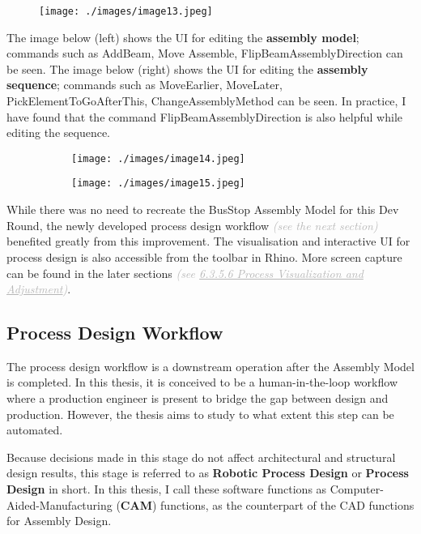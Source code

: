 \begin{figure}[H]
\texttt{[image: ./images/image13.jpeg]}
\end{figure}


The image below (left) shows the UI for editing the \textbf{assembly model}; commands such as AddBeam, Move Assemble, FlipBeamAssemblyDirection can be seen. The image below (right) shows the UI for editing the \textbf{assembly sequence}; commands such as MoveEarlier, MoveLater, PickElementToGoAfterThis, ChangeAssemblyMethod can be seen. In practice, I have found that the command FlipBeamAssemblyDirection is also helpful while editing the sequence.

\begin{figure}[H]
\centering
\begin{subfigure}[b]{0.45\textwidth}
\centering
\texttt{[image: ./images/image14.jpeg]}
\end{subfigure}
\hfill
\begin{subfigure}[b]{0.45\textwidth}
\centering
\texttt{[image: ./images/image15.jpeg]}
\end{subfigure}
\end{figure}


While there was no need to recreate the BusStop Assembly Model for this Dev Round, the newly developed process design workflow \textit{\textcolor[HTML]{B7B7B7}{(see the next section) }}benefited greatly from this improvement. The visualisation and interactive UI for process design is also accessible from the toolbar in Rhino. More screen capture can be found in the later sections \textit{\textcolor[HTML]{B7B7B7}{(see \uline{6.3.5.6 Process Visualization and Adjustment})}}.

\subsection{Process Design Workflow}

The process design workflow is a downstream operation after the Assembly Model is completed. In this thesis, it is conceived to be a human-in-the-loop workflow where a production engineer is present to bridge the gap between design and production. However, the thesis aims to study to what extent this step can be automated.

Because decisions made in this stage do not affect architectural and structural design results, this stage is referred to as\textbf{ Robotic Process Design} or \textbf{Process Design }in short. In this thesis, I call these software functions as Computer-Aided-Manufacturing (\textbf{CAM}) functions, as the counterpart of the CAD functions for Assembly Design.

